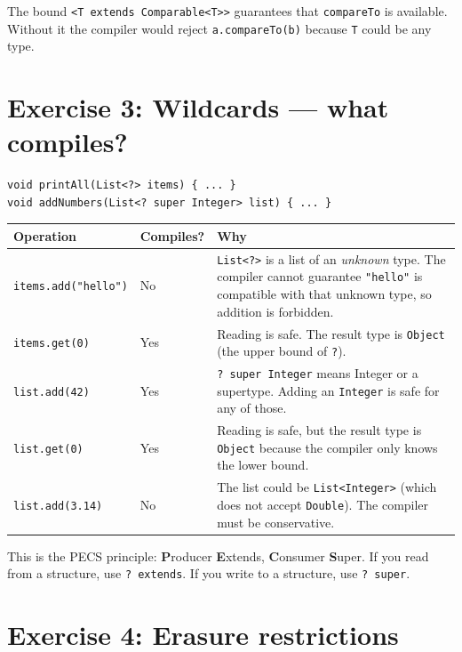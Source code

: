 \documentclass[twoside=false,DIV=14]{scrartcl}
\begin{document}
The bound \texttt{<T extends Comparable<T>{}>} guarantees that \texttt{compareTo} is available.  Without it the compiler would reject \texttt{a.compareTo(b)} because \texttt{T} could be any type.


\section*{Exercise 3: Wildcards --- what compiles?}

\begin{lstlisting}
void printAll(List<?> items) { ... }
void addNumbers(List<? super Integer> list) { ... }
\end{lstlisting}

\begin{tabular}{lp{3cm}p{6cm}}
\toprule
\textbf{Operation} & \textbf{Compiles?} & \textbf{Why} \\
\midrule
\verb|items.add("hello")| & No & \texttt{List<?>} is a list of an \emph{unknown} type.  The compiler cannot guarantee \texttt{"hello"} is compatible with that unknown type, so addition is forbidden. \\
\verb|items.get(0)| & Yes & Reading is safe.  The result type is \texttt{Object} (the upper bound of \texttt{?}). \\
\verb|list.add(42)| & Yes & \texttt{? super Integer} means Integer or a supertype.  Adding an \texttt{Integer} is safe for any of those. \\
\verb|list.get(0)| & Yes & Reading is safe, but the result type is \texttt{Object} because the compiler only knows the lower bound. \\
\verb|list.add(3.14)| & No & The list could be \texttt{List<Integer>} (which does not accept \texttt{Double}).  The compiler must be conservative. \\
\bottomrule
\end{tabular}

This is the PECS principle: \textbf{P}roducer \textbf{E}xtends, \textbf{C}onsumer \textbf{S}uper.  If you read from a structure, use \texttt{? extends}.  If you write to a structure, use \texttt{? super}.


\section*{Exercise 4: Erasure restrictions}
\end{document}
